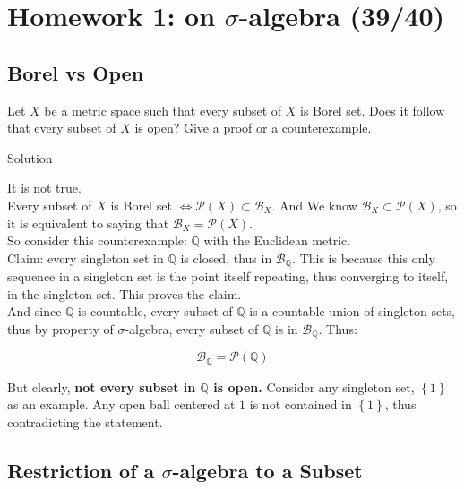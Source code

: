 \chapter{\texorpdfstring{Homework 1: on \(\sigma\)-algebra (39/40)}{Homework 1: on \textbackslash sigma-algebra (39/40)}}\label{homework-1-on-sigma-algebra-3940}

\section{Borel vs Open}\label{borel-vs-open}

Let \(X\) be a metric space such that every subset of \(X\) is Borel set. Does it follow that every subset of \(X\) is open? Give a proof or a counterexample.

\begin{qlsolution}{Solution}

It is not true.\\
Every subset of \(X\) is Borel set \(\Leftrightarrow\mathcal{P}(X) \subset \mathcal{B}_{X}\). And We know \(\mathcal{B}_{X} \subset \mathcal{P}(X)\), so it is equivalent to saying that \(\mathcal{B}_{X} = \mathcal{P}(X)\).\\
So consider this counterexample: \(\mathbb{Q}\) with the Euclidean metric.\\
Claim: every singleton set in \(\mathbb{Q}\) is closed, thus in \(\mathcal{B}_{\mathbb{Q}}\). This is because this only sequence in a singleton set is the point itself repeating, thus converging to itself, in the singleton set. This proves the claim.\\
And since \(\mathbb{Q}\) is countable, every subset of \(\mathbb{Q}\) is a countable union of singleton sets, thus by property of \(\sigma\)-algebra, every subset of \(\mathbb{Q}\) is in \(\mathcal{B}_{\mathbb{Q}}\). Thus:

\[\mathcal{B}_{\mathbb{Q}} = \mathcal{P}(\mathbb{Q})\]

But clearly, \textbf{not every subset in \(\mathbb{Q}\) is open.} Consider any singleton set, \(\left\{ 1 \right\}\) as an example. Any open ball centered at \(1\) is not contained in \(\left\{ 1 \right\}\), thus contradicting the statement.

\end{qlsolution}

\section{\texorpdfstring{Restriction of a \(\sigma\)-algebra to a Subset}{Restriction of a \textbackslash sigma-algebra to a Subset}}\label{restriction-of-a-sigma-algebra-to-a-subset}

